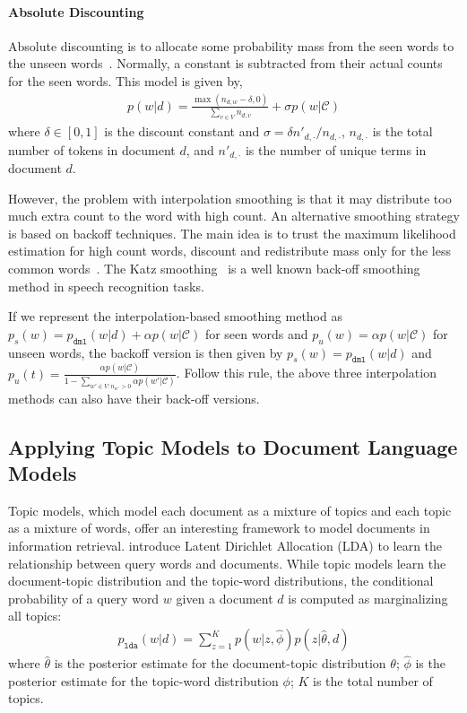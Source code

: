 \paragraph{Absolute Discounting}

Absolute discounting is to allocate some probability mass from the seen words to the unseen words~\cite{Ney-1994}. Normally, a constant is subtracted from their actual counts for the seen words. This model is given by,
\begin{align}
p(w|d) = \frac{\max(n_{d,w} - \delta, 0)}{\sum_{v \in V} n_{d,v}} + \sigma p(w|\mathcal{C})
\end{align}
where $\delta \in [0,1]$ is the discount constant and $\sigma = \delta n'_{d,\cdot} / n_{d, \cdot}$, $n_{d, \cdot}$ is the total number of tokens in document $d$, and $n'_{d,\cdot}$ is the number of unique terms in document $d$. 

However, the problem with interpolation smoothing is that it may distribute too much extra count to the word with high count. An alternative smoothing strategy is based on backoff techniques. The main idea is to trust the maximum likelihood estimation for high count words, discount and  redistribute mass only for the less common words~\cite{zhai-01}. The Katz smoothing~\citep{katz-87} is a well known back-off smoothing method in speech recognition tasks. 

If we represent the interpolation-based smoothing method as $p_s(w) = p_{\texttt{dml}}(w|d) + \alpha p(w|\mathcal{C})$ for seen words and $p_u(w) = \alpha p(w|\mathcal{C})$ for unseen words, the backoff version is then given by $p_s(w) = p_{\texttt{dml}}(w|d)$ and $p_u(t) = \frac{\alpha p(w|\mathcal{C})}{1-\sum_{w' \in V: n_{w'}>0} \alpha p(w'|\mathcal{C})}$. Follow this rule, the above three interpolation methods can also have their back-off versions.


\subsection{Applying Topic Models to Document Language Models}

Topic models, which model each document as a mixture of topics and each topic as a mixture of words, offer an interesting framework to model documents in information retrieval. \cite{wei-06} introduce Latent Dirichlet Allocation (LDA) to learn the relationship between query words and documents. While topic models learn the document-topic distribution and the topic-word distributions, the conditional probability of a query word $w$ given a document $d$ is computed as marginalizing all topics:
\begin{align}
p_{\texttt{lda}}(w|d) = \sum_{z=1}^K p(w|z, \hat{\phi}) p(z | \hat{\theta}, d)
\end{align}
where $\hat{\theta}$ is the posterior estimate for the document-topic distribution $\theta$; $\hat{\phi}$ is the posterior estimate for the topic-word distribution $\phi$; $K$ is the total number of topics.

